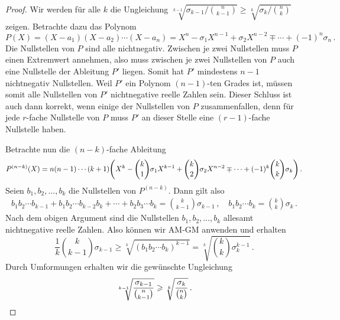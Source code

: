 \begin{proof}
	Wir werden für alle $k$ die Ungleichung $\sqrt[k-1]{\sigma_{k-1}/\binom{n}{k-1}}\geqslant \sqrt[k]{\sigma_k/\binom{n}{k}}$ zeigen. Betrachte dazu das Polynom
	\begin{equation*}
		P(X)=(X-a_1)(X-a_2)\dotsm (X-a_n)=X^n-\sigma_1 X^{n-1}+\sigma_2 X^{n-2}\mp\dotsb+(-1)^n\sigma_n\,.
	\end{equation*}
	Die Nullstellen von $P$ sind alle nichtnegativ. Zwischen je zwei Nullstellen muss $P$ einen Extremwert annehmen, also muss zwischen je zwei Nullstellen von $P$ auch eine Nullstelle der Ableitung $P'$ liegen. Somit hat $P'$ mindestens $n-1$ nichtnegativ Nullstellen. Weil $P'$ ein Polynom $(n-1)$-ten Grades ist, müssen somit alle Nullstellen von $P'$ nichtnegative reelle Zahlen sein. Dieser Schluss ist auch dann korrekt, wenn einige der Nullstellen von $P$ zusammenfallen, denn für jede $r$-fache Nullstelle von $P$ muss $P'$ an dieser Stelle eine $(r-1)$-fache Nullstelle haben.
	
	Betrachte nun die $(n-k)$-fache Ableitung
	\begin{equation*}
		P^{(n-k)}(X)=n(n-1)\dotsm (k+1)\parens*{X^k-\binom{k}{1}\sigma_1 X^{k-1}+\binom{k}{2}\sigma_2 X^{n-2}\mp\dotsb+(-1)^{k}\binom{k}{k}\sigma_k}\,.
	\end{equation*}
	Seien $b_1,b_2,\dotsc,b_k$ die Nullstellen von $P^{(n-k)}$. Dann gilt also
	\begin{align*}
		b_1b_2\dotsm b_{k-1}+b_1b_2\dotsm b_{k-2}b_k+\dotsb+b_2b_3\dotsm b_k=\binom{k}{k-1}\sigma_{k-1}\,,\quad b_1b_2\dotsm b_k= \binom{k}{k}\sigma_k\,.
	\end{align*}
	Nach dem obigen Argument sind die Nullstellen $b_1,b_2,\dotsc,b_k$ allesamt nichtnegative reelle Zahlen. Also können wir AM-GM anwenden und erhalten
	\begin{equation*}
		\frac{1}{k}\binom{k}{k-1}\sigma_{k-1}\geqslant \sqrt[k]{(b_1b_2\dotsm b_k)^{k-1}}=\sqrt[k]{\binom{k}{k}\sigma_k^{k-1}}\,.
	\end{equation*}
	Durch Umformungen erhalten wir die gewünschte Ungleichung
	\begin{equation*}
		\sqrt[k-1]{\frac{\sigma_{k-1}}{\binom{n}{k-1}}}\geqslant \sqrt[k]{\frac{\sigma_k}{\binom{n}{k}}}\,.\qedhere
	\end{equation*}
\end{proof}


